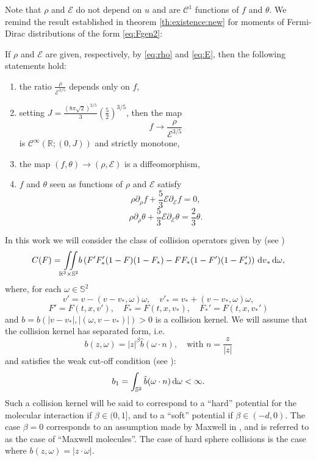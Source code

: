 Note that $\rho$ and $\mathcal E$ do not depend on $u$ and are $\mathcal C^1$ functions of $f$ and $\theta$.
We remind the result established in theorem \ref{th:existence:new} for moments of  Fermi-Dirac distributions of the form \eqref{eq:Fgen2}:

\begin{theorem*}\label{th:existence:new-d} If $\rho$ and $\mathcal E$ are given, respectively, by \eqref{eq:rho} and \eqref{eq:E}, then the following statements hold: \begin{enumerate}\item
	the ratio $\frac{\rho}{\mathcal E^{3/5}}$ depends only on $f$, 
 \item setting $J=\frac{(8\pi\sqrt 2)^{2/5}}{3}\left(\frac 52 \right)^{3/5} $, then the map \[f\to\frac{\rho}{\mathcal E^{3/5}}\]is  $\mathcal C^\infty (\mathbb R; (0,J))$ and strictly monotone,

\item the map $(f,\theta)\to(\rho,\mathcal E)$ is a diffeomorphism,

\item $f$ and $\theta$ seen as functions of $\rho$ and $\mathcal E$ satisfy
\begin{equation}\label{eq:transp:f-d}\rho\partial_\rho f +\frac 53\mathcal E \partial_{\mathcal E}f=0, \end{equation}
\begin{equation}\label{eq:transp:theta-d}\rho\partial_\rho \theta +\frac 53\mathcal E \partial_{\mathcal E}\theta=\frac 23\theta.\end{equation}
\end{enumerate}
\end{theorem*}

In this work we will consider the class of collision operators given by (see \cite{Lifshitz1981Course,Dolbeault1994FD})
\begin{equation}\label {eq:Cform}
C(F) = {\iint\limits_{\mathbb R^3\times\mathbb S^2}} b\left(F'F'_\ast(1-F)(1-F_\ast)-FF_\ast(1-F')(1-F'_\ast)\right) {\,\mathrm{d} v}_\ast {\,\mathrm{d} \omega},
\end{equation}
where, for each $\omega \in\mathbb S^2$ \[v' = v- (v-v_\ast,\omega)\omega,\quad v'_\ast= v_\ast+ (v-v_\ast,\omega)\omega,\]
\[F'=F(t,x,v'), \quad F_\ast=F(t,x,v_\ast),\quad F_\ast'=F(t,x,v_\ast')\]
and $b=b(|v-v_\ast|,|(\omega,v-v_\ast)|)>0$ is a collision kernel.
We will assume that the collision kernel has separated form, i.e.
\[ b(z, \omega) = |z|^\beta \hat b \left(\omega \cdot n \right),\quad \mbox{with }n=\frac{z}{|z|}\]
and satisfies the weak cut-off condition (see \cite{Grad:weakCO}):
 \begin{equation}\label{eq:b1FD
}
 	b_1 = \int_{{\mathbb {S}^2}} \hat b(\omega\cdot n){\,\mathrm{d} \omega}< \infty.
 \end{equation}
Such a collision kernel will be said to correspond to a \enquote{hard} potential for the molecular
interaction if $\beta \in  (0, 1]$, and to a  \enquote{soft} potential if $\beta\in(-d,0)$.
The case $\beta=0$ corresponds to an assumption made by Maxwell 
in \cite{maxwell1867dynamical}, and is referred to as the case of  \enquote{Maxwell molecules}.
The case of hard sphere collisions is the case where $b(z, \omega) = |z \cdot \omega|$.

